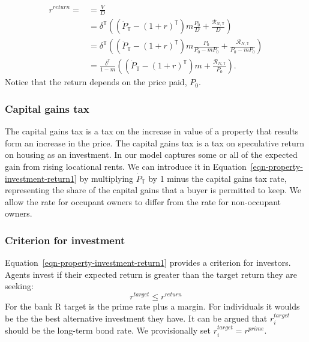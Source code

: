 {\begin{align}
r^{return} =
  &= \frac{V}{D}  \nonumber \\
  &= \delta^\mathbb{T} \left((\dot P_\mathbb{T} - (1+r)^\mathbb{T})m \frac{P_0}{D} + \frac{\mathcal{R}_{N, \mathbb{T}}}{D}\right) \nonumber \\
   &= \delta^\mathbb{T} \left((\dot P_\mathbb{T} - (1+r)^\mathbb{T})m \frac{P_0}{P_0-mP_0} + \frac{\mathcal{R}_{N, \mathbb{T}}}{P_0-mP_0}\right) \nonumber \\
  &= \frac{\delta^\mathbb{T}}{1-m} \left((\dot P_\mathbb{T} - (1+r)^\mathbb{T})m  + \frac{\mathcal{R}_{N, \mathbb{T}}}{P_0}\right).\label{eqn-property-investment-return1} 
\end{align}
Notice that the return depends on the price paid, $P_0$. 

\subsubsection{Capital gains tax}
The \gls{capital gains tax} is %
a tax on the increase in value of a property that results form an increase in the price. The capital gains tax is a tax on speculative return on housing as an investment. In our model captures some or all of the expected gain from rising locational rents. We can introduce it in Equation~\ref{eqn-property-investment-return1} by multiplying $\dot P_\mathbb{T}$ by 1 minus the capital gains tax rate, representing the share of the capital gains that a buyer is permitted to keep. We allow the rate for occupant owners to differ from the rate for non-occupant owners.


\subsubsection{Criterion for investment}
Equation~\ref{eqn-property-investment-return1} provides a criterion for investors. %
 Agents invest if  their expected return is greater than the target return they are seeking:
\begin{equation}
r^{target}\le r^{return} 
\label{eqn-property-investment-return2}
\end{equation}
For the bank R target is the prime rate plus a margin. For individuals it woulds be the the best alternative investment they have. It can be argued that  $r^{target}_i$ should be the long-term bond rate. We provisionally set $r^{target}_i=r^{prime}$.

}
